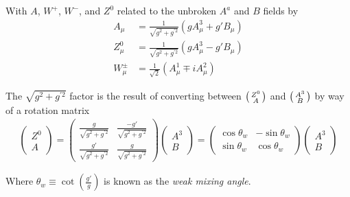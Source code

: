         With $A$, $W^+$, $W^-$, and $Z^0$ related to the unbroken $A^a$ and $B$ fields by
        \begin{equation} \begin{split}
            A_{\mu} & = \frac{1}{\sqrt{g^2 + g^{\prime 2}}} ( gA^3_{\mu} + g'B_{\mu} ) \\
            Z^0_{\mu} & = \frac{1}{\sqrt{g^2 + g^{\prime 2}}} ( gA^3_{\mu} - g'B_{\mu} ) \\
            W^{\pm}_{\mu} & = \frac{1}{\sqrt{2}} (A^1_{\mu} \mp iA^2_{\mu})
        \end{split} \end{equation}

        The $\sqrt{g^2 + g^{\prime 2}}$ factor is the result of converting between
            $\big(\begin{smallmatrix} Z^0 \\ A \end{smallmatrix}\big)$ and $\big(\begin{smallmatrix} A^3 \\ B \end{smallmatrix}\big)$ by way of a rotation matrix
        \begin{equation} \begin{split}
            \begin{pmatrix} Z^0 \\ A \end{pmatrix} =
            \begin{pmatrix}
                \frac{g}{\sqrt{g^2 + g^{\prime 2}}} & \frac{-g'}{\sqrt{g^2 + g^{\prime 2}}} \\
                \frac{g'}{\sqrt{g^2 + g^{\prime 2}}} & \frac{g}{\sqrt{g^2 + g^{\prime 2}}}
            \end{pmatrix} \begin{pmatrix} A^3 \\ B \end{pmatrix} = 
            \begin{pmatrix}
                \cos\theta_w & -\sin\theta_w \\
                \sin\theta_w & \cos\theta_w
            \end{pmatrix} \begin{pmatrix} A^3 \\ B \end{pmatrix}
        \end{split} \end{equation}

        Where $\theta_w \equiv \cot(\frac{g'}{g})$ is known as the \textit{weak mixing angle}.







